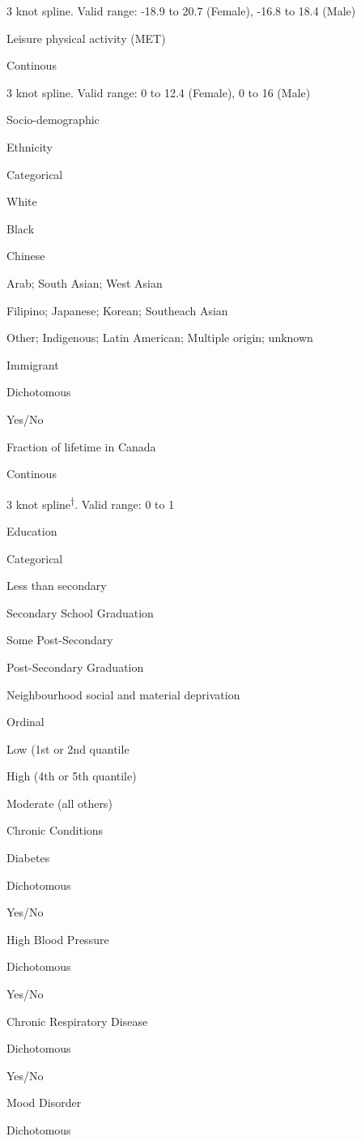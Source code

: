 \documentclass[]{book}
\begin{document}
3 knot spline. Valid range: -18.9 to 20.7 (Female), -16.8 to 18.4 (Male)

Leisure physical activity (MET)

Continous

3 knot spline. Valid range: 0 to 12.4 (Female), 0 to 16 (Male)

Socio-demographic

Ethnicity

Categorical

White

Black

Chinese

Arab; South Asian; West Asian

Filipino; Japanese; Korean; Southeach Asian

Other; Indigenous; Latin American; Multiple origin; unknown

Immigrant

Dichotomous

Yes/No

Fraction of lifetime in Canada

Continous

3 knot spline\textsuperscript{†}. Valid range: 0 to 1

Education

Categorical

Less than secondary

Secondary School Graduation

Some Post-Secondary

Post-Secondary Graduation

Neighbourhood social and material deprivation

Ordinal

Low (1st or 2nd quantile

High (4th or 5th quantile)

Moderate (all others)

Chronic Conditions

Diabetes

Dichotomous

Yes/No

High Blood Pressure

Dichotomous

Yes/No

Chronic Respiratory Disease

Dichotomous

Yes/No

Mood Disorder

Dichotomous
\end{document}
